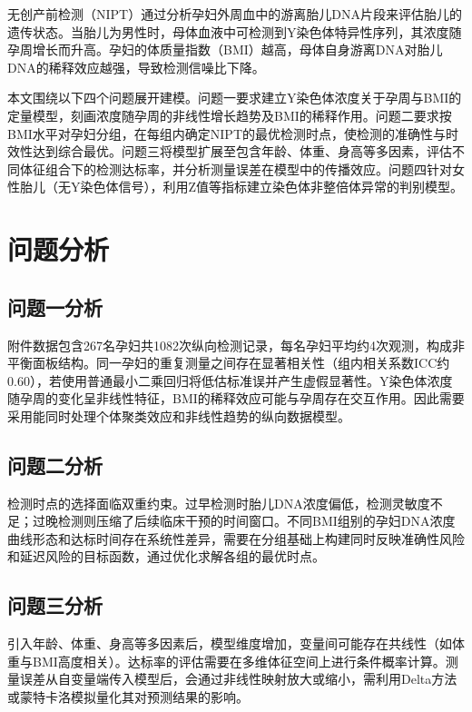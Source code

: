 \documentclass[withoutpreface]{cumcmthesis}
\begin{document}
无创产前检测（NIPT）通过分析孕妇外周血中的游离胎儿DNA片段来评估胎儿的遗传状态。当胎儿为男性时，母体血液中可检测到Y染色体特异性序列，其浓度随孕周增长而升高。孕妇的体质量指数（BMI）越高，母体自身游离DNA对胎儿DNA的稀释效应越强，导致检测信噪比下降。

本文围绕以下四个问题展开建模。问题一要求建立Y染色体浓度关于孕周与BMI的定量模型，刻画浓度随孕周的非线性增长趋势及BMI的稀释作用。问题二要求按BMI水平对孕妇分组，在每组内确定NIPT的最优检测时点，使检测的准确性与时效性达到综合最优。问题三将模型扩展至包含年龄、体重、身高等多因素，评估不同体征组合下的检测达标率，并分析测量误差在模型中的传播效应。问题四针对女性胎儿（无Y染色体信号），利用Z值等指标建立染色体非整倍体异常的判别模型。

\section{问题分析}

\subsection{问题一分析}

附件数据包含267名孕妇共1082次纵向检测记录，每名孕妇平均约4次观测，构成非平衡面板结构。同一孕妇的重复测量之间存在显著相关性（组内相关系数ICC约0.60），若使用普通最小二乘回归将低估标准误并产生虚假显著性。Y染色体浓度随孕周的变化呈非线性特征，BMI的稀释效应可能与孕周存在交互作用。因此需要采用能同时处理个体聚类效应和非线性趋势的纵向数据模型。

\subsection{问题二分析}

检测时点的选择面临双重约束。过早检测时胎儿DNA浓度偏低，检测灵敏度不足；过晚检测则压缩了后续临床干预的时间窗口。不同BMI组别的孕妇DNA浓度曲线形态和达标时间存在系统性差异，需要在分组基础上构建同时反映准确性风险和延迟风险的目标函数，通过优化求解各组的最优时点。

\subsection{问题三分析}

引入年龄、体重、身高等多因素后，模型维度增加，变量间可能存在共线性（如体重与BMI高度相关）。达标率的评估需要在多维体征空间上进行条件概率计算。测量误差从自变量端传入模型后，会通过非线性映射放大或缩小，需利用Delta方法或蒙特卡洛模拟量化其对预测结果的影响。
\end{document}
